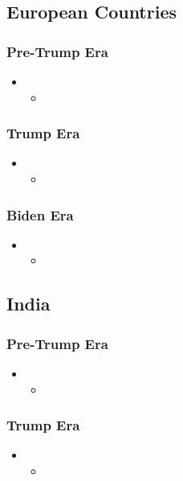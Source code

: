 \documentclass[12pt]{article} %
\begin{document}
	\subsection{European Countries}
		\subsubsection{Pre-Trump Era}
			\begin{itemize}
			\item	
				\begin{itemize}
				\item	
				\end{itemize}
			\end{itemize}
		\subsubsection{Trump Era}
			\begin{itemize}
			\item	
				\begin{itemize}
				\item	
				\end{itemize}
			\end{itemize}
		\subsubsection{Biden Era}
			\begin{itemize}
			\item	
				\begin{itemize}
				\item	
				\end{itemize}
			\end{itemize}
			
	\subsection{India}
		\subsubsection{Pre-Trump Era}
			\begin{itemize}
			\item	
				\begin{itemize}
				\item	
				\end{itemize}
			\end{itemize}
		\subsubsection{Trump Era}
			\begin{itemize}
			\item	
				\begin{itemize}
				\item	
				\end{itemize}
			\end{itemize}
\end{document}
